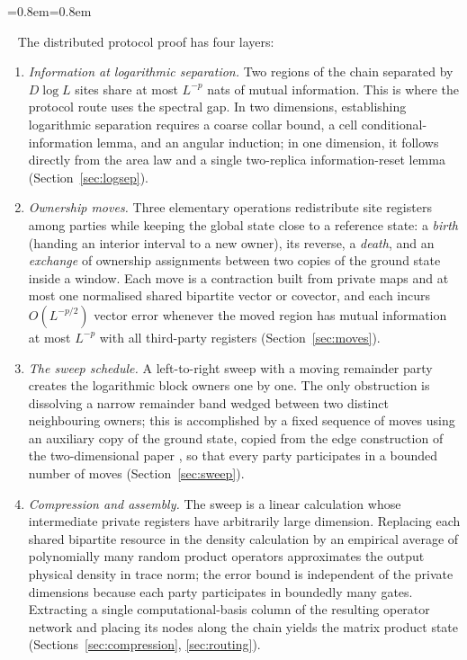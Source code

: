 \documentclass[aps,prx,reprint,superscriptaddress,floatfix,nofootinbib,longbibliography,amsmath,amssymb]{revtex4-2}
\theoremstyle{plain}
\theoremstyle{definition}
\newenvironment{inwords}{%
  \par\medskip\noindent
  \begin{list}{}{\leftmargin=0.8em\rightmargin=0.8em}
  \item\relax
  \noindent{\sffamily\bfseries\color{blue!40!black}In words.}\ \sffamily\small}{%
  \end{list}\par\medskip}
\begin{document}
\begin{inwords}
The distributed protocol proof has four layers:
\begin{enumerate}[leftmargin=2em]
\item \emph{Information at logarithmic separation.} Two regions of the
chain separated by $D\log L$ sites share at most $L^{-p}$ nats of mutual
information. This is where the protocol route uses the
spectral gap. In two dimensions, establishing logarithmic
separation requires a coarse collar bound, a cell conditional-information
lemma, and an angular induction; in one dimension, it follows directly from
the area law and a single two-replica information-reset lemma
(Section~\ref{sec:logsep}).
\item \emph{Ownership moves.} Three elementary operations redistribute site
registers among parties while keeping the global state close to a reference
state: a \emph{birth} (handing an interior interval to a new owner), its
reverse, a \emph{death}, and an \emph{exchange} of ownership assignments
between two copies of the ground state inside a window. Each move is a
contraction built from private maps and at most one normalised shared
bipartite vector or covector, and each incurs $O(L^{-p/2})$ vector error
whenever the moved region has mutual information at most $L^{-p}$ with all
third-party registers (Section~\ref{sec:moves}).
\item \emph{The sweep schedule.} A left-to-right sweep with a moving
remainder party creates the logarithmic block owners one by one. The only
obstruction is dissolving a narrow remainder band wedged between two
distinct neighbouring owners; this is accomplished by a fixed sequence of
moves using an auxiliary copy of the ground state, copied from the edge
construction of the two-dimensional paper \cite{PP}, so that every party
participates in a bounded number of moves (Section~\ref{sec:sweep}).
\item \emph{Compression and assembly.} The sweep is a linear calculation
whose intermediate private registers have arbitrarily large dimension.
Replacing each shared bipartite resource in the density calculation by an
empirical average of polynomially many random product operators approximates
the output physical density in trace norm; the error bound is independent
of the private dimensions because each party participates in boundedly many
gates. Extracting a single computational-basis column of the resulting
operator network and placing its nodes along the chain yields the matrix
product state (Sections~\ref{sec:compression}, \ref{sec:routing}).
\end{enumerate}
\end{inwords}
\end{document}
